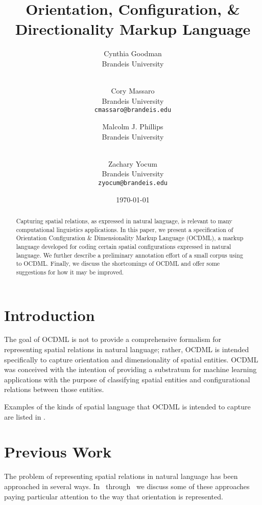 \documentclass[11pt]{article}
\title{Orientation, Configuration, \& Directionality Markup Language}
\author{
    Cynthia Goodman \\
    Brandeis University \\
    \textt{cpg@brandeis.edu} \\
    \and
    Cory Massaro \\
    Brandeis University \\
    \texttt{cmassaro@brandeis.edu} \\
    \and
    Malcolm J. Phillips \\
    Brandeis University \\
    \textt{icos@brandeis.edu} \\
    \and
    Zachary Yocum \\
    Brandeis University \\
    \texttt{zyocum@brandeis.edu} 
}
\date{\today}
\newcommand{\crefrangeconjunction}{~through~}
\begin{document}

\begin{abstract}
    Capturing spatial relations, as expressed in natural language, is relevant
    to many computational linguistics applications. In this paper, we present a
    specification of Orientation Configuration \& Dimensionality Markup
    Language (OCDML), a markup language developed for coding certain spatial
    configurations expressed in natural language. We further describe a
    preliminary annotation effort of a small corpus using to OCDML. Finally, we
    discuss the shortcomings of OCDML and offer some suggestions for how it may
    be improved.
\end{abstract}

\section{Introduction} %
\label{sec:introduction}
The goal of OCDML is not to provide a comprehensive formalism for representing spatial relations in natural language; rather, OCDML is intended specifically to capture orientation and dimensionality of spatial entities. OCDML was conceived with the intention of providing a substratum for machine learning applications with the purpose of classifying spatial entities and configurational relations between those entities.

Examples of the kinds of spatial language that OCDML is intended to capture are listed in .

\label{ex:intro_examples}


\section{Previous Work} %
\label{sec:previous_work}

The problem of representing spatial relations in natural language has been approached in several ways. In \crefrangeconjunction{} we discuss some of these approaches paying particular attention to the way that orientation is represented.
\end{document}
